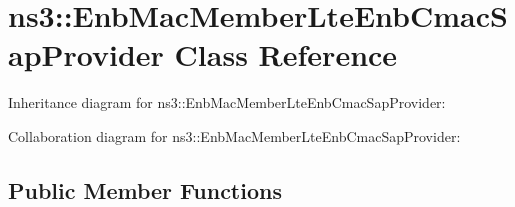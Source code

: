 \hypertarget{classns3_1_1EnbMacMemberLteEnbCmacSapProvider}{}\section{ns3\+:\+:Enb\+Mac\+Member\+Lte\+Enb\+Cmac\+Sap\+Provider Class Reference}
\label{classns3_1_1EnbMacMemberLteEnbCmacSapProvider}


Inheritance diagram for ns3\+:\+:Enb\+Mac\+Member\+Lte\+Enb\+Cmac\+Sap\+Provider\+:


Collaboration diagram for ns3\+:\+:Enb\+Mac\+Member\+Lte\+Enb\+Cmac\+Sap\+Provider\+:
\subsection*{Public Member Functions}
